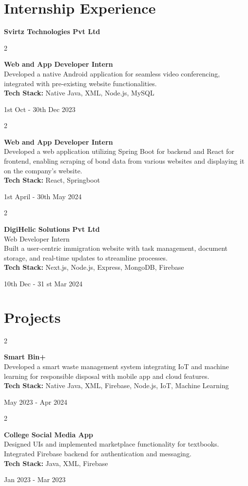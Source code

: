 \documentclass[10pt, letterpaper]{article}
\newenvironment{twocolentry}[2][]{
    \onecolentry
    \def\secondColumn{#2}
    \setcolumnwidth{\fill, 4.5 cm}
    \begin{paracol}{2}
}{
    \switchcolumn \raggedleft \secondColumn
    \end{paracol}
    \endonecolentry
}
\begin{document}
\section{Internship Experience}
    \textbf{Svirtz Technologies Pvt Ltd}
\begin{twocolentry}{1st Oct - 30th Dec 2023}
    \textbf{Web and App Developer Intern}\\
    Developed a native Android application for seamless video conferencing, integrated with pre-existing website functionalities.\\
    \textbf{Tech Stack:} Native Java, XML, Node.js, MySQL
\end{twocolentry}
\begin{twocolentry}{1st April - 30th May 2024}
    \textbf{Web and App Developer Intern}\\
    Developed a web application utilizing Spring Boot for backend and React for frontend, enabling
scraping of bond data from various websites and displaying it on the company's website. \\
    \textbf{Tech Stack:} React, Springboot
\end{twocolentry}

\begin{twocolentry}{10th Dec - 31 st Mar 2024}
    \textbf{DigiHelic Solutions Pvt Ltd}\\
    Web Developer Intern\\
    Built a user-centric immigration website with task management, document storage, and real-time updates to streamline processes.\\
    \textbf{Tech Stack:} Next.js, Node.js, Express, MongoDB, Firebase
\end{twocolentry}

\section{Projects}
\begin{twocolentry}{May 2023 - Apr 2024}
    \textbf{Smart Bin+}\\
    Developed a smart waste management system integrating IoT and machine learning for responsible disposal with mobile app and cloud features.\\
    \textbf{Tech Stack:} Native Java, XML, Firebase, Node.js, IoT, Machine Learning
\end{twocolentry}

\begin{twocolentry}{Jan 2023 - Mar 2023}
    \textbf{College Social Media App}\\
    Designed UIs and implemented marketplace functionality for textbooks. Integrated Firebase backend for authentication and messaging.\\
    \textbf{Tech Stack:} Java, XML, Firebase
\end{twocolentry}
\end{document}

